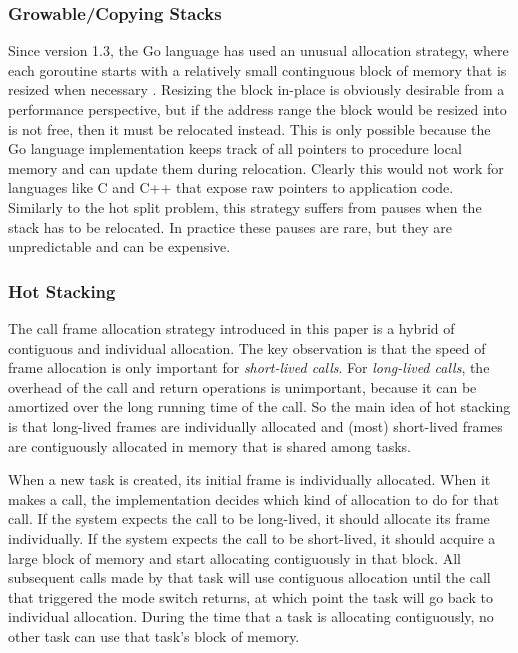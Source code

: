 \documentclass[acmsmall,anonymous,review]{acmart}\settopmatter{printfolios=true,printccs=false,printacmref=false}
\begin{document}

\subsubsection{Growable/Copying Stacks}
\label{sec:go_stacks}

Since version 1.3, the Go language has used an unusual allocation strategy, where each goroutine starts with a relatively small continguous block of memory that is resized when necessary \cite{Cheney2014, Morsing2014}.
Resizing the block in-place is obviously desirable from a performance perspective, but if the address range the block would be resized into is not free, then it must be relocated instead.
This is only possible because the Go language implementation keeps track of all pointers to procedure local memory and can update them during relocation.
Clearly this would not work for languages like C and C++ that expose raw pointers to application code.
Similarly to the hot split problem, this strategy suffers from pauses when the stack has to be relocated.
In practice these pauses are rare, but they are unpredictable and can be expensive.

\subsubsection{Hot Stacking}

The call frame allocation strategy introduced in this paper is a hybrid of contiguous and individual allocation.
The key observation is that the speed of frame allocation is only important for \emph{short-lived calls}.
For \emph{long-lived calls}, the overhead of the call and return operations is unimportant, because it can be amortized over the long running time of the call.
So the main idea of hot stacking is that long-lived frames are individually allocated and (most) short-lived frames are contiguously allocated in memory that is shared among tasks.

When a new task is created, its initial frame is individually allocated.
When it makes a call, the implementation decides which kind of allocation to do for that call.
If the system expects the call to be long-lived, it should allocate its frame individually.
If the system expects the call to be short-lived, it should acquire a large block of memory and start allocating contiguously in that block.
All subsequent calls made by that task will use contiguous allocation until the call that triggered the mode switch returns, at which point the task will go back to individual allocation.
During the time that a task is allocating contiguously, no other task can use that task's block of memory.
\end{document}
